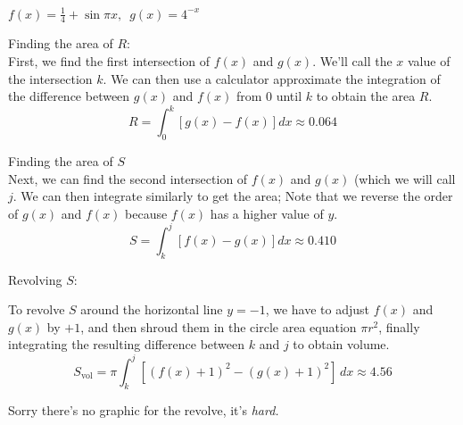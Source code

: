 \begin{center}
\end{center}

\begin{center}
	\noindent
	$f(x) = \frac{1}{4} + \sin{\pi x}, \enspace g(x) = 4^{-x}$ \\
\end{center}

\noindent
Finding the area of $R$: \\

First, we find the first intersection of $f(x)$ and $g(x)$. We'll call the $x$ value of the intersection $k$. We can then use a calculator approximate the integration of the difference between $g(x)$ and $f(x)$ from $0$ until $k$ to obtain the area $R$.
\[ R = \int_{0}^{k} [g(x) - f(x)]dx \approx 0.064 \]

\noindent
Finding the area of $S$ \\

Next, we can find the second intersection of $f(x)$ and $g(x)$ (which we will call $j$. We can then integrate similarly to get the area; Note that we reverse the order of $g(x)$ and $f(x)$ because $f(x)$ has a higher value of $y$.
\[	S = \int_{k}^{j} [f(x) - g(x)]dx \approx 0.410 \]

\noindent
Revolving $S$:

To revolve $S$ around the horizontal line $y = -1$, we have to adjust $f(x)$ and $g(x)$ by $+1$, and then shroud them in the circle area equation $\pi r^2$, finally integrating the resulting difference between $k$ and $j$ to obtain volume.
\[ S_{\text{vol}} = \pi\!\int_{k}^{j} [(f(x)+1)^2 - (g(x)+1)^2]\,dx \approx 4.56 \]

Sorry there's no graphic for the revolve, it's \textit{hard.}
